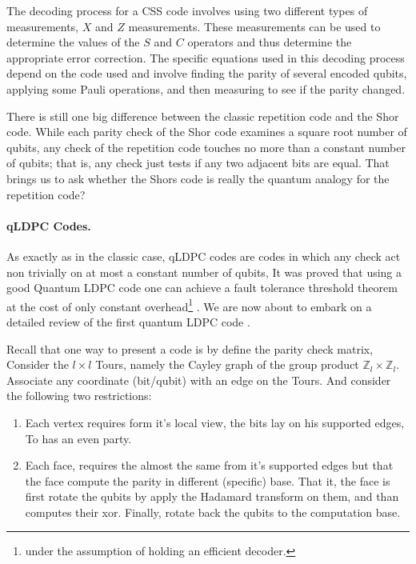 The decoding process for a CSS code involves using two different types of measurements, $X$ and $Z$ measurements. These measurements can be used to determine the values of the $S$ and $C$ operators and thus determine the appropriate error correction. The specific equations used in this decoding process depend on the code used and involve finding the parity of several encoded qubits, applying some Pauli operations, and then measuring to see if the parity changed.


There is still one big difference between the classic repetition code and the Shor code. While each parity check of the Shor code examines a square root number of qubits, any check of the repetition code touches no more than a constant number of qubits; that is, any check just tests if any two adjacent bits are equal.  That brings us to ask whether the Shors code is really the quantum analogy for the repetition code? 

\paragraph{qLDPC Codes.} As exactly as in the classic case, qLDPC codes are codes in which any check act non trivially on at most a constant number of qubits, It was proved that using a good Quantum LDPC code one can achieve a fault tolerance threshold theorem at the cost of only constant overhead\footnote{under the assumption of holding an efficient decoder.} \cite{gottesman2014faulttolerant}. We are now about to embark on a detailed review of the first quantum LDPC code \cite{Dennis_2002}. 

Recall that one way to present a code is by define the parity check matrix, Consider the $l\times l$ Tours, namely the Cayley graph of the group product  $\mathbb{Z}_{l} \times \mathbb{Z}_{l}$. Associate any coordinate (bit/qubit) with an edge on the Tours. And consider the following two restrictions:

\begin{enumerate}
  \item Each vertex requires form it's local view, the bits lay on his supported edges, To has an even party. 
  \item Each face, requires the almost the same from it's supported edges but that the face compute the parity in different (specific) base. That it, the face is first rotate the qubits by apply the Hadamard transform on them, and than computes their xor. Finally, rotate back the qubits to the computation base.   
\end{enumerate}

